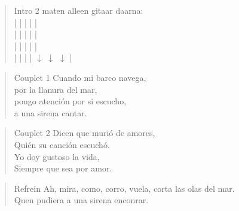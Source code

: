 
\begin{verse}{Intro}
2 maten alleen gitaar  daarna:\\
|  \hspace{4.05em} | \hspace{5.35em} | \hspace{5.35em} |  \hspace{5em} |\\
|  \hspace{5em} | \hspace{5.35em} | \hspace{5.35em} |  \hspace{4.05em} |\\
|  \hspace{4.05em} | \hspace{5.35em} | \hspace{5.35em} |  \hspace{4.05em} |\\
|  \hspace{4.05em} |  \hspace{3.5em} |  \hspace{4.35em} | $\downarrow$  $\downarrow$ $\downarrow$ |\\
\end{verse}

\begin{verse}{Couplet 1}
Cuando mi barco navega,\\ 
por la llanura del mar,\\ 
\chord{}pongo atención por si escucho,\\ 
a una sirena cantar.\\ 
\end{verse}

\begin{verse}{Couplet 2}
Dicen que murió de amores,\\ 
Quién su canción escuchó. \\
\chord{}Yo doy gustoso la vida, \\
Siempre que sea por amor. \\
\end{verse}

\begin{verse}{Refrein}
Ah, mira, como,  corro, vuela, corta las olas del mar.\\
Quen pudiera a una sirena enconrar.
\end{verse}

